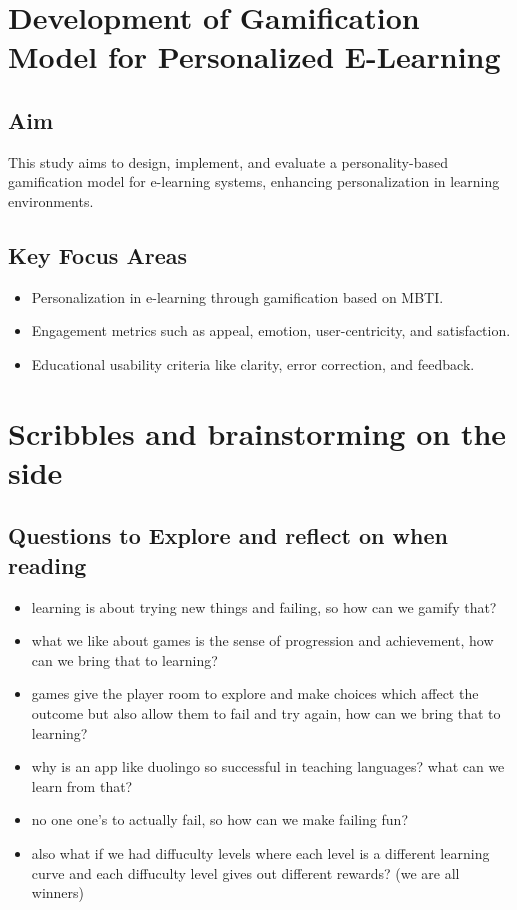 \documentclass{article}
\begin{document}
\newpage
\section{Development of Gamification Model for Personalized E-Learning}

\subsection{Aim}
This study aims to design, implement, and evaluate a personality-based gamification model for e-learning systems, enhancing personalization in learning environments.

\subsection{Key Focus Areas}
\begin{itemize}
    \item Personalization in e-learning through gamification based on MBTI.
    \item Engagement metrics such as appeal, emotion, user-centricity, and satisfaction.
    \item Educational usability criteria like clarity, error correction, and feedback.
\end{itemize}

\newpage
\section{Scribbles and brainstorming on the side}

\subsection{Questions to Explore and reflect on when reading}
\begin{itemize}
    \item learning is about trying new things and failing, so how can we gamify that?
    \item what we like about games is the sense of progression and achievement, how can we bring that to learning?
    \item games give the player room to explore and make choices which affect the outcome but also allow them to fail and try again, how can we bring that to learning?
    \item why is an app like duolingo so successful in teaching languages? what can we learn from that?
    \item no one one's to actually fail, so how can we make failing fun?
    \item also what if we had diffuculty levels where each level is a different learning curve and each diffuculty level gives out different rewards? (we are all winners)
\end{itemize}
\end{document}
